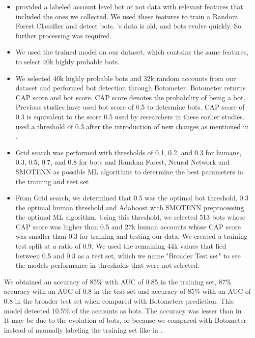 \documentclass[letterpaper]{article}
\begin{document}
\begin{itemize}
    \item \cite{cresci2017paradigm} provided a labeled account level bot or not data with relevant features that included the ones we collected.
    We used these features to train a Random Forest Classifier and detect bots. 
    \cite{cresci2017paradigm}'s data is old, and bots evolve quickly. So further processing was required.
    \item We used the trained model on our dataset, which contains the same features, to select 40k highly probable bots.
    \item We selected 40k highly probable bots and 32k random accounts from our dataset and performed bot detection through Botometer. Botometer returns CAP score and bot score. CAP score denotes the probability of being a bot. 
    Previous studies have used bot score of 0.5 to determine bots. CAP score of 0.3 is equivalent to the score 0.5 used by researchers in these earlier studies. \cite{deb2019perils} used a threshold of 0.3 after the 
    introduction of new changes as mentioned in \cite{yang2019arming}.
    \item Grid search was performed with thresholds of 0.1, 0.2, and 0.3 for humans, 0.3, 0.5, 0.7, and 0.8 for bots and Random Forest, Neural Network
     and SMOTENN as possible ML algorithms to determine the best parameters in the training and test set
    \item From Grid search, we determined that 0.5 was the optimal bot threshold, 0.3 the optimal human threshold and Adaboost with SMOTENN preprocessing the optimal ML algorithm. Using this threshold, we selected 513 bots whose CAP score was higher than 0.5  and 
    27k human accounts whose CAP score was smaller than 0.3 for training and testing our data. We created a training-test split at a ratio of 0.9. We used the remaining 44k values that lied between 0.5 and 0.3 as a test set,
    which we name "Broader Test set" to see the models performance in thresholds that were not selected. 
\end{itemize}

We obtained an accuracy of 85\% with AUC of 0.85 in the training set, 87\% accuracy with 
an AUC of 0.8 in the test set and accuracy of 85\% with an AUC of 0.8 in the broader test set when compared with Botometers prediction. This model detected 10.5\% of the accounts as 
bots. The accuracy was lesser than in \cite{kudugunta2018deep}. It may be due to the evolution of bots, or because we compared with Botometer instead of manually labeling the training set like in  \cite{kudugunta2018deep}. 
\end{document}
